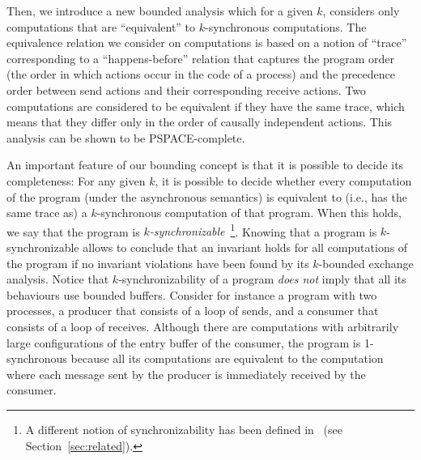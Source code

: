 Then, we introduce a new bounded analysis which %
for a given $k$, considers only computations that are “equivalent” to $k$-synchronous computations. The equivalence relation we consider on computations is based on a notion of “trace” corresponding to a “happens-before” relation that captures the program order (the order in which actions occur in the code of a process) and the precedence order between send actions and their corresponding receive actions. Two computations are considered to be equivalent if they have the same trace, which means that they differ only in the order of causally independent actions. This analysis can be shown to be PSPACE-complete. 
%

An important feature of our bounding concept is that it is possible to decide its completeness: For any given $k$, it is possible to decide whether every computation of the program (under the asynchronous semantics) is equivalent to (i.e., has the same trace as) a $k$-synchronous computation of that program. 
When this holds, we say that the program is {\em $k$-synchronizable}~\footnote{A different notion of synchronizability has been defined in~\cite{DBLP:journals/tcs/BasuB16} (see Section~\ref{sec:related}).}. Knowing that a program is $k$-synchronizable allows to conclude that an invariant holds for all computations of the program if no invariant violations have been found by its $k$-bounded exchange analysis. Notice that $k$-synchronizability of a program {\em does not} imply that all its behaviours use bounded buffers.
Consider for instance a program with two processes, a producer that consists of a loop of sends, and a consumer that consists of a loop of receives. Although there are computations with arbitrarily large configurations of the entry buffer of the consumer, the program is 1-synchronous because all its computations are equivalent to the computation where each message sent by the producer is immediately received by the consumer. 

